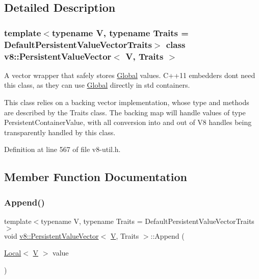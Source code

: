 \subsection{Detailed Description}
\subsubsection*{template$<$typename V, typename Traits = Default\+Persistent\+Value\+Vector\+Traits$>$\newline
class v8\+::\+Persistent\+Value\+Vector$<$ V, Traits $>$}

A vector wrapper that safely stores \mbox{\hyperlink{classv8_1_1Global}{Global}} values. C++11 embedders don\textquotesingle{}t need this class, as they can use \mbox{\hyperlink{classv8_1_1Global}{Global}} directly in std containers.

This class relies on a backing vector implementation, whose type and methods are described by the Traits class. The backing map will handle values of type Persistent\+Container\+Value, with all conversion into and out of V8 handles being transparently handled by this class. 

Definition at line 567 of file v8-\/util.\+h.



\subsection{Member Function Documentation}
\mbox{\label{classv8_1_1PersistentValueVector_a02376c6d16be29084db46f65473477fb}} 
\subsubsection{\texorpdfstring{Append()}{Append()}\hspace{0.1cm}{\footnotesize\ttfamily [1/2]}}
{\footnotesize\ttfamily template$<$typename V, typename Traits = Default\+Persistent\+Value\+Vector\+Traits$>$ \\
void \mbox{\hyperlink{classv8_1_1PersistentValueVector}{v8\+::\+Persistent\+Value\+Vector}}$<$ \mbox{\hyperlink{classV}{V}}, Traits $>$\+::Append (\begin{DoxyParamCaption}\item[{\mbox{\hyperlink{classv8_1_1Local}{Local}}$<$ \mbox{\hyperlink{classV}{V}} $>$}]{value }\end{DoxyParamCaption})\hspace{0.3cm}{\ttfamily [inline]}}


